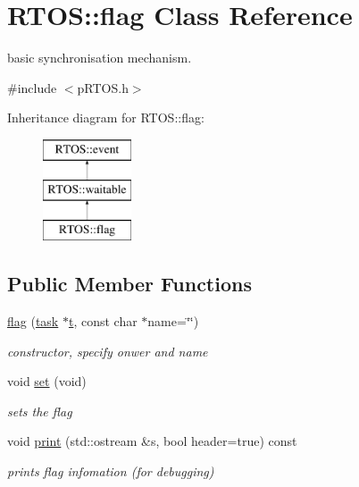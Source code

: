 \hypertarget{class_r_t_o_s_1_1flag}{}\section{R\+T\+OS\+:\+:flag Class Reference}
\label{class_r_t_o_s_1_1flag}


basic synchronisation mechanism.  




{\ttfamily \#include $<$p\+R\+T\+O\+S.\+h$>$}

Inheritance diagram for R\+T\+OS\+:\+:flag\+:\begin{figure}[H]
\begin{center}
\leavevmode
\includegraphics[height=3.000000cm]{class_r_t_o_s_1_1flag}
\end{center}
\end{figure}
\subsection*{Public Member Functions}
\begin{DoxyCompactItemize}
\item 
\hyperlink{class_r_t_o_s_1_1flag_a2d05d296b33e6cbc141fd4fb5e6f2740}{flag} (\hyperlink{class_r_t_o_s_1_1task}{task} $\ast$\hyperlink{class_r_t_o_s_1_1event_a1402687edb26c1d5d26e54dbda21919d}{t}, const char $\ast$name=\char`\"{}\char`\"{})
\begin{DoxyCompactList}\small\item\em constructor, specify onwer and name \end{DoxyCompactList}\item 
void \hyperlink{class_r_t_o_s_1_1flag_aae862c6b7c385a4920d9a486e25ad5d8}{set} (void)
\begin{DoxyCompactList}\small\item\em sets the flag \end{DoxyCompactList}\item 
void \hyperlink{class_r_t_o_s_1_1flag_a38ac8e72fcd0b7bcc45fd00acb156cbb}{print} (std\+::ostream \&s, bool header=true) const \hypertarget{class_r_t_o_s_1_1flag_a38ac8e72fcd0b7bcc45fd00acb156cbb}{}\label{class_r_t_o_s_1_1flag_a38ac8e72fcd0b7bcc45fd00acb156cbb}

\begin{DoxyCompactList}\small\item\em prints flag infomation (for debugging) \end{DoxyCompactList}\end{DoxyCompactItemize}

